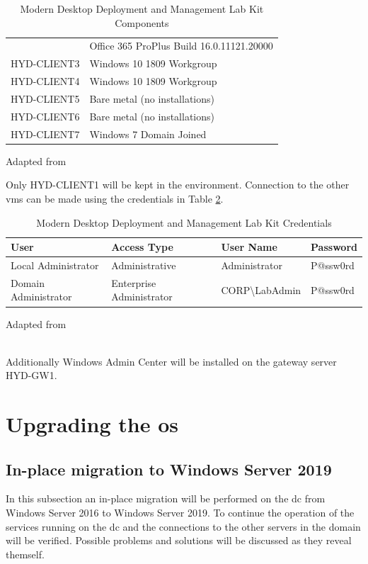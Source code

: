 \begin{table}[ht]
\begin{adjustbox}{width=1\textwidth}
\begin{tabular}{l|l}
		& Office 365 ProPlus Build 16.0.11121.20000                           									 \\
		HYD-CLIENT3  & Windows 10 1809 Workgroup                                         						  \\
		HYD-CLIENT4  & Windows 10 1809 Workgroup                                          						   \\
		HYD-CLIENT5 & Bare metal (no installations)                                      						    \\
		HYD-CLIENT6 & Bare metal (no installations)                                       							 \\
		HYD-CLIENT7  & Windows 7 Domain Joined                                            
	\end{tabular}
	\end{adjustbox}
	\caption[Lab Kit Components]{Modern Desktop Deployment and Management Lab Kit Components}
	\scriptsize	
	Adapted from \cite{MicrosoftCorporation2019}
	\label{tab:MDDMLK2016}
\end{table}

	
Only HYD-CLIENT1 will be kept in the environment. Connection to the other \acrshort{vm}s can be made using the credentials in Table \ref{tab:MDDMLKC2016}.
\begin{table}[ht]
	\centering
	\begin{adjustbox}{width=1\textwidth}
	\begin{tabular}{l|lll}
		User                 & Access Type              & User Name                    & Password \\
		\hline
		Local Administrator  & Administrative           & Administrator                & P@ssw0rd \\
		Domain Administrator & Enterprise Administrator & CORP\textbackslash{}LabAdmin & P@ssw0rd
	\end{tabular}
	\end{adjustbox}
	\caption[Lab Kit Credentials]{Modern Desktop Deployment and Management Lab Kit Credentials}
	\scriptsize	
	Adapted from \cite{MicrosoftCorporation2019}
	\label{tab:MDDMLKC2016}
\end{table}
\\
Additionally Windows Admin Center will be installed on the gateway server HYD-GW1. 
\section{Upgrading the \acrshort{os}}
\subsection{In-place migration to Windows Server 2019}
\label{subsection:inplace}
In this subsection an in-place migration will be performed on the \acrfull{dc} from Windows Server 2016 to Windows Server 2019. To continue the operation of the services running on the \acrshort{dc} and the connections to the other servers in the domain will be verified. Possible problems and solutions will be discussed as they reveal themself.
